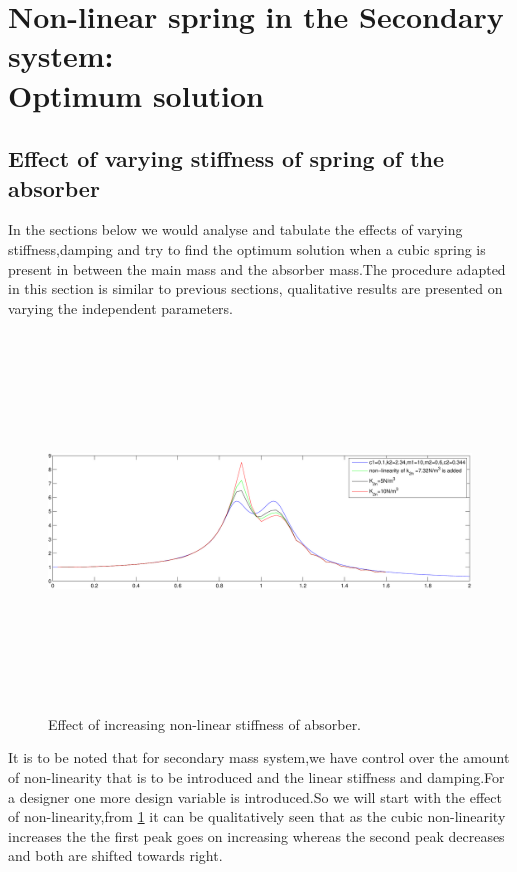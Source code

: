 \section{Non-linear spring in the Secondary system:\\ Optimum solution}
\subsection{Effect of varying stiffness of spring of the absorber }
In the sections below we would analyse and tabulate the effects of varying stiffness,damping and try to find the optimum solution when a cubic spring is present in between the main mass and the absorber mass.The procedure adapted in this section is similar to previous sections, qualitative results are presented on varying the independent parameters.
\begin{figure}[h!]
\includegraphics[width=16cm,height=10cm]{"figures/nonlinearity_secondary_1"}
  \caption{Effect of increasing non-linear stiffness of absorber.}
  \label{fig:non-linear secondary 1}
  \end{figure}

It is to be noted that for secondary mass system,we have control over the amount of non-linearity that is to be introduced and the linear stiffness and damping.For a designer one more design variable is introduced.So we will start with the effect of non-linearity,from \ref{fig:non-linear secondary 1} it can be qualitatively seen that as the cubic non-linearity increases the the first peak goes on increasing whereas the second peak decreases and both are shifted towards right.\\

